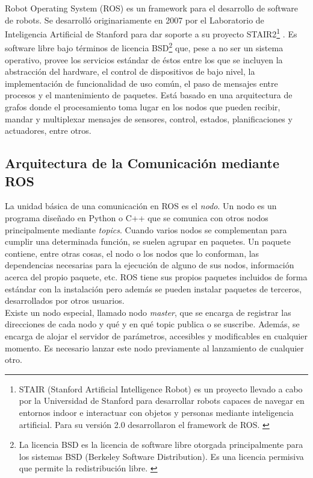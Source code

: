 Robot Operating System (ROS) es un framework para el desarrollo de software de robots. Se desarrolló originariamente en 2007 por el Laboratorio de Inteligencia Artificial de Stanford para dar soporte a su proyecto STAIR2\footnote{STAIR (Stanford Artificial Intelligence Robot) es un proyecto llevado a cabo por la Universidad de Stanford para desarrollar robots capaces de navegar en entornos indoor e interactuar con objetos y personas mediante inteligencia artificial. Para su versión 2.0 desarrollaron el framework de ROS. \cite{stair}} \cite{stair_paper}. Es software libre bajo términos de licencia BSD\footnote{La licencia BSD es la licencia de software libre otorgada principalmente para los sistemas BSD (Berkeley Software Distribution). Es una licencia permisiva que permite la redistribución libre. \cite{licencia}} que, pese a no ser un sistema operativo, provee los servicios estándar de éstos entre los que se incluyen la abstracción del hardware, el control de dispositivos de bajo nivel, la implementación de funcionalidad de uso común, el paso de mensajes entre procesos y el mantenimiento de paquetes. Está basado en una arquitectura de grafos donde el procesamiento toma lugar en los nodos que pueden recibir, mandar y multiplexar mensajes de sensores, control, estados, planificaciones y actuadores, entre otros.\\


\subsection{Arquitectura de la Comunicación mediante ROS}

La unidad básica de una comunicación en ROS es el \textit{nodo}. Un nodo es un programa diseñado en Python o C++ que se comunica con otros nodos principalmente mediante \textit{topics}. Cuando varios nodos se complementan para cumplir una determinada función, se suelen agrupar en paquetes. Un paquete contiene, entre otras cosas, el nodo o los nodos que lo conforman, las dependencias necesarias para la ejecución de alguno de sus nodos, información acerca del propio paquete, etc. ROS tiene sus propios paquetes incluidos de forma estándar con la instalación pero además se pueden instalar paquetes de terceros, desarrollados por otros usuarios.\\

Existe un nodo especial, llamado nodo \textit{master}, que se encarga de registrar las direcciones de cada nodo y qué y en qué topic publica o se suscribe. Además, se encarga de alojar el servidor de parámetros, accesibles y modificables en cualquier momento. Es necesario lanzar este nodo previamente al lanzamiento de cualquier otro. \\

